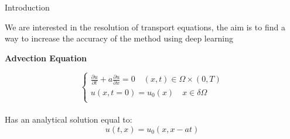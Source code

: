 \begin{frame}{Introduction}
    
    We are interested in the resolution of transport equations, the aim is to find a way to increase the accuracy of the method using deep learning
    
    \vspace{0.3cm}

    \textbf{Advection Equation}
 
    \begin{equation}
        \begin{cases}
        \frac{\partial u}{\partial t} + a \frac{\partial u}{\partial x} = 0 \quad (x,t) \in \Omega \times (0,T) \\
         u(x,t=0) = u_0(x) \quad x \in \delta \Omega \\
        \end{cases}
    \end{equation}
    \\

    Has an analytical solution equal to: 
    $$
    u(t, x)=u_0(x, x-at)
    $$
    
\end{frame}